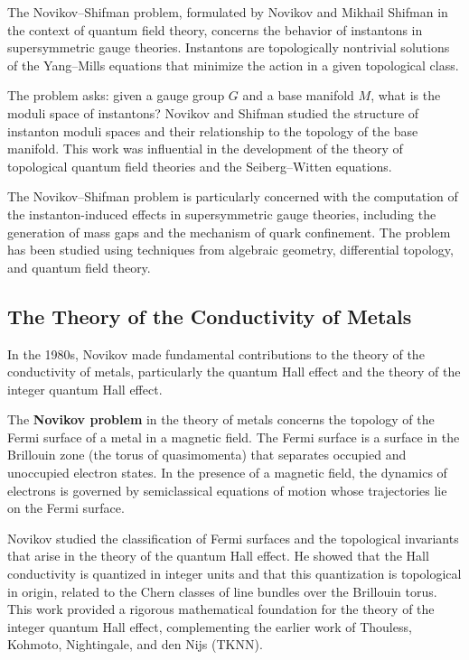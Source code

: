 The Novikov--Shifman problem, formulated by Novikov and Mikhail Shifman in the context of quantum field theory, concerns the behavior of instantons in supersymmetric gauge theories. Instantons are topologically nontrivial solutions of the Yang--Mills equations that minimize the action in a given topological class.

The problem asks: given a gauge group \(G\) and a base manifold \(M\), what is the moduli space of instantons? Novikov and Shifman studied the structure of instanton moduli spaces and their relationship to the topology of the base manifold. This work was influential in the development of the theory of topological quantum field theories and the Seiberg--Witten equations.

The Novikov--Shifman problem is particularly concerned with the computation of the instanton-induced effects in supersymmetric gauge theories, including the generation of mass gaps and the mechanism of quark confinement. The problem has been studied using techniques from algebraic geometry, differential topology, and quantum field theory.

\subsection{The Theory of the Conductivity of Metals}

In the 1980s, Novikov made fundamental contributions to the theory of the conductivity of metals, particularly the quantum Hall effect and the theory of the integer quantum Hall effect.

The \textbf{Novikov problem} in the theory of metals concerns the topology of the Fermi surface of a metal in a magnetic field. The Fermi surface is a surface in the Brillouin zone (the torus of quasimomenta) that separates occupied and unoccupied electron states. In the presence of a magnetic field, the dynamics of electrons is governed by semiclassical equations of motion whose trajectories lie on the Fermi surface.

Novikov studied the classification of Fermi surfaces and the topological invariants that arise in the theory of the quantum Hall effect. He showed that the Hall conductivity is quantized in integer units and that this quantization is topological in origin, related to the Chern classes of line bundles over the Brillouin torus. This work provided a rigorous mathematical foundation for the theory of the integer quantum Hall effect, complementing the earlier work of Thouless, Kohmoto, Nightingale, and den Nijs (TKNN).

